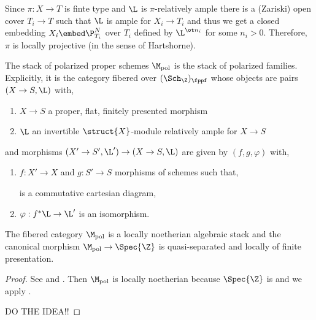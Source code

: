 \documentclass[12pt]{article}
\begin{document}
\begin{rmk}
Since $\pi : X \to T$ is finte type and $\L$ is $\pi$-relatively ample there is a (Zariski) open cover $T_i \to T$ such that $\L$ is ample for $X_i \to T_i$ and thus we get a closed embedding $X_i \embed \P^N_{T_i}$ over $T_i$ defined by $\L^{\ot n_i}$ for some $n_i > 0$. Therefore, $\pi$ is locally projective (in the sense of Hartshorne). 
\end{rmk}

\newcommand{\pol}{\mathrm{pol}}


\begin{defn}
The stack of polarized proper schemes $\M_{\pol}$ is the stack of polarized families. Explicitly, it is the category fibered over $(\Sch_{\Z})_{\fppf}$ whose objects are pairs $(X \to S, \L)$ with,
\begin{enumerate}
\item $X \to S$ a proper, flat, finitely presented morphism
\item $\L$ an invertible $\struct{X}$-module relatively ample for $X \to S$
\end{enumerate}
and morphisms $(X' \to S', \L') \to (X \to S, \L)$ are given by $(f,g,\varphi)$ with,
\begin{enumerate}
\item $f : X' \to X$ and $g : S' \to S$ morphisms of schemes such that,
\begin{center}
\end{center}
is a commutative cartesian diagram,
\item $\varphi : f^* \L \to \L'$ is an isomorphism.
\end{enumerate}
\end{defn}

\begin{thm}
The fibered category $\M_{\pol}$ is a locally noetherian algebraic stack and the canonical morphism $\M_{\pol} \to \Spec{\Z}$ is quasi-separated and locally of finite presentation.
\end{thm}

\begin{proof}
See  and .
Then $\M_{\pol}$ is locally noetherian because $\Spec{\Z}$ is and we apply . 

DO THE IDEA!!
\end{proof}
\end{document}
